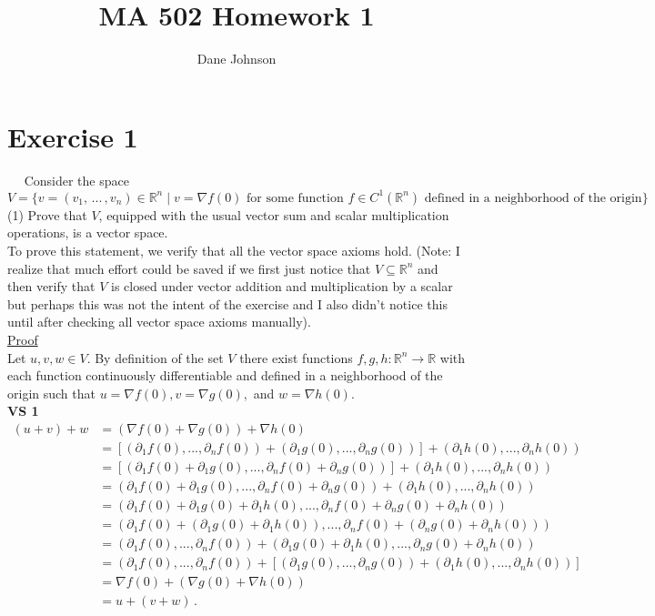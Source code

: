 \documentclass[11pt]{article}
\title{MA 502 Homework 1}
\author{Dane Johnson}
\begin{document}
\maketitle

\section*{Exercise 1}
$\quad$ Consider the space
$ V = \{v = (v_1,\, ... \,, v_n) \in \mathbb{R}^n \; | \; v = \nabla f(0) \text{ for some function } f \in C^1(\mathbb{R}^n) \text{ defined in a neighborhood of the origin} \}$ \\

(1) Prove that $V$, equipped with the usual vector sum and scalar multiplication operations, is a vector space.\\

To prove this statement, we verify that all the vector space axioms hold. (Note: I realize that much effort could be saved if we first just notice that $V \subseteq \mathbb{R}^n$ and then verify that $V$ is closed under vector addition and multiplication by a scalar but perhaps this was not the intent of the exercise and I also didn't notice this until after checking all vector space axioms manually).\\

\underline{Proof} \\

Let $u,v,w \in V$. By definition of the set $V$ there exist functions $f,g,h : \mathbb{R}^n \rightarrow \mathbb{R}$ with each function continuously differentiable and defined in a neighborhood of the origin such that $u = \nabla f(0), v = \nabla g(0), $ and $ w = \nabla h(0)$. \\

\textbf{VS 1} 
\begin{align*}
(u + v) + w &= (\nabla f(0) + \nabla g(0) ) + \nabla h(0)\\
&= \left[(\partial_1 f(0),...,\partial_n f(0) ) + (\partial_1 g(0),..., \partial_n g(0))\right] +(\partial_1 h(0),..., \partial_n h(0)) \\
&=\left[(\partial_1 f(0) + \partial_1 g(0),...,\partial_n f(0)+\partial_n g(0) ) \right] +(\partial_1 h(0),..., \partial_n h(0)) \\
&=(\partial_1 f(0) + \partial_1 g(0),...,\partial_n f(0)+\partial_n g(0) ) + (\partial_1 h(0),..., \partial_n h(0))\\
&= (\partial_1 f(0) + \partial_1 g(0) + \partial_1 h(0),...,\partial_n f(0)+\partial_n g(0)+\partial_n h(0) )\\
&=(\partial_1 f(0) + (\partial_1 g(0) + \partial_1 h(0)),...,\partial_n f(0)+(\partial_n g(0)+\partial_n h(0)))\\
&=(\partial_1 f(0),...,\partial_n f(0)) + (\partial_1 g(0) + \partial_1 h(0),...,\partial_n g(0) + \partial_n h(0))\\
&=(\partial_1 f(0),...,\partial_n f(0)) + \left[(\partial_1 g(0),...,\partial_n g(0)) + (\partial_1 h(0),...,\partial_n h(0))\right]\\
&= \nabla f(0) + (\nabla g(0)  + \nabla h(0))\\
&=u + (v+w)\,.
\end{align*}
\end{document}
